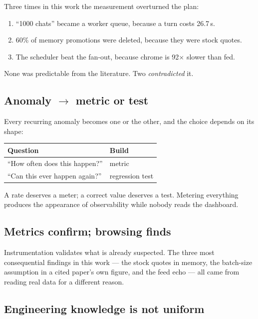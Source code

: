 \documentclass[10pt,twocolumn]{article}
\begin{document}
Three times in this work the measurement overturned the plan:

\begin{enumerate}\itemsep1pt
\item ``1000 chats'' became a worker queue, because a turn costs 26.7\,s.
\item 60\% of memory promotions were deleted, because they were stock quotes.
\item The scheduler beat the fan-out, because chrome is 92$\times$ slower than fed.
\end{enumerate}

None was predictable from the literature. Two \emph{contradicted} it.

\subsection{Anomaly $\to$ metric or test}

Every recurring anomaly becomes one or the other, and the choice depends on its shape:

\begin{table}[h]
\centering\small
\begin{tabular}{@{}ll@{}}
\toprule
\textbf{Question} & \textbf{Build} \\
\midrule
``How often does this happen?'' & metric \\
``Can this ever happen again?'' & regression test \\
\bottomrule
\end{tabular}
\end{table}

A rate deserves a meter; a correct value deserves a test. Metering everything produces
the appearance of observability while nobody reads the dashboard.

\subsection{Metrics confirm; browsing finds}

Instrumentation validates what is already suspected. The three most consequential
findings in this work --- the stock quotes in memory, the batch-size assumption in a cited
paper's own figure, and the feed echo --- all came from reading real data for a different
reason.

\subsection{Engineering knowledge is not uniform}
\end{document}
